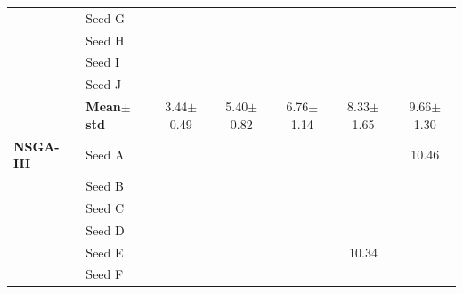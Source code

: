 \begin{table}[H]
{\begin{tabular}{@{}llccccc@{}}
 & Seed G & \cellcolor{RoyalBlue!10}{\small 3.79} & \cellcolor{RoyalBlue!10}{\small 5.60} & \cellcolor{RoyalBlue!10}{\small 6.81} & \cellcolor{RoyalBlue!10}{\small 7.11} & \cellcolor{RoyalBlue!10}{\small 9.37} \\
 & Seed H & \cellcolor{RoyalBlue!10}{\small 3.33} & \cellcolor{RoyalBlue!10}{\small 6.02} & \cellcolor{RoyalBlue!10}{\small 7.86} & \cellcolor{RoyalBlue!10}{\small 7.16} & \cellcolor{RoyalBlue!10}{\small 8.98} \\
 & Seed I & \cellcolor{RoyalBlue!10}{\small 3.23} & \cellcolor{RoyalBlue!10}{\small 5.22} & \cellcolor{RoyalBlue!10}{\small 6.17} & \cellcolor{RoyalBlue!10}{\small 7.58} & \cellcolor{RoyalBlue!10}{\small 8.87} \\
 & Seed J & \cellcolor{RoyalBlue!10}{\small 3.18} & \cellcolor{RoyalBlue!10}{\small 4.50} & \cellcolor{RoyalBlue!10}{\small 5.19} & \cellcolor{RoyalBlue!10}{\small 7.73} & \cellcolor{RoyalBlue!10}{\small 9.78} \\
 & \textbf{Mean$\pm$std} & \cellcolor{RoyalBlue!20}3.44$\pm$0.49 & \cellcolor{RoyalBlue!20}5.40$\pm$0.82 & \cellcolor{RoyalBlue!20}6.76$\pm$1.14 & \cellcolor{RoyalBlue!20}8.33$\pm$1.65 & \cellcolor{RoyalBlue!20}9.66$\pm$1.30 \\
\midrule
\textbf{NSGA-III} & Seed A & \cellcolor{RoyalBlue!10}{\small 2.62} & \cellcolor{RoyalBlue!10}{\small 6.76} & \cellcolor{RoyalBlue!10}{\small 6.23} & \cellcolor{RoyalBlue!10}{\small 8.22} & {\small\color{gray!60!black}10.46} \\
 & Seed B & \cellcolor{RoyalBlue!10}{\small 2.79} & \cellcolor{RoyalBlue!10}{\small 4.49} & \cellcolor{RoyalBlue!10}{\small 5.79} & \cellcolor{RoyalBlue!10}{\small 7.59} & \cellcolor{RoyalBlue!10}{\small 8.81} \\
 & Seed C & \cellcolor{RoyalBlue!10}{\small 4.02} & \cellcolor{RoyalBlue!10}{\small 5.11} & \cellcolor{RoyalBlue!10}{\small 5.90} & \cellcolor{RoyalBlue!10}{\small 7.49} & \cellcolor{RoyalBlue!10}{\small 8.53} \\
 & Seed D & \cellcolor{RoyalBlue!10}{\small 3.73} & \cellcolor{RoyalBlue!10}{\small 5.14} & \cellcolor{RoyalBlue!10}{\small 6.17} & \cellcolor{RoyalBlue!10}{\small 7.27} & \cellcolor{RoyalBlue!10}{\small 9.40} \\
 & Seed E & \cellcolor{RoyalBlue!10}{\small 3.69} & \cellcolor{RoyalBlue!10}{\small 4.16} & \cellcolor{RoyalBlue!10}{\small 5.68} & {\small\color{gray!60!black}10.34} & \cellcolor{RoyalBlue!10}{\small 7.21} \\
 & Seed F & \cellcolor{RoyalBlue!10}{\small 3.85} & \cellcolor{RoyalBlue!10}{\small 5.30} & \cellcolor{RoyalBlue!10}{\small 5.76} & \cellcolor{RoyalBlue!10}{\small 7.94} & \cellcolor{RoyalBlue!10}{\small 9.22} \\

\end{tabular}}
\end{table}
